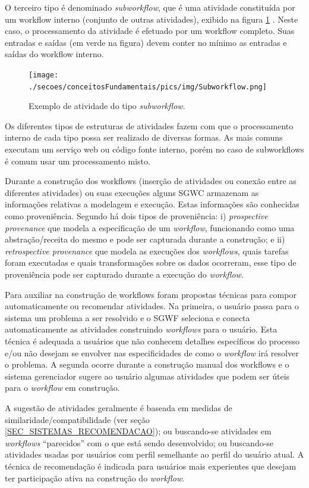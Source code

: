 O terceiro tipo é denominado \emph{subworkflow}, que é uma atividade constituída por um workflow interno (conjunto de outras atividades), exibido na figura \ref{figura_atividade_subworkflow} \cite{medeiros_woodss_2005}. Neste caso, o processamento da atividade é efetuado por um workflow completo. Suas entradas e saídas (em verde na figura) devem conter no mínimo as entradas e saídas do workflow interno.
\begin{figure}[!hbt]
    \centering  
    \caption{Exemplo de atividade do tipo \emph{subworkflow}.}
    \texttt{[image: ./secoes/conceitosFundamentais/pics/img/Subworkflow.png]}    
	\label{figura_atividade_subworkflow}
\end{figure}

Os diferentes tipos de estruturas de atividades fazem com que o processamento interno de cada tipo possa ser realizado de diversas formas. As mais comuns executam um serviço web ou código fonte interno, porém no caso de subworkflows é comum usar um processamento misto. 

Durante a construção dos workflows (inserção de atividades ou conexão entre as diferentes atividades) ou suas execuções alguns SGWC armazenam as informações relativas a modelagem e execução. Estas informações são conhecidas como proveniência. Segundo  há dois tipos de proveniência: i) \emph{prospective provenance} que modela a especificação de um \emph{workflow}, funcionando como uma abstração/receita do mesmo e pode ser capturada durante a construção; e ii) \emph{retrospective provenance} que modela as execuções dos \emph{workflows}, quais tarefas foram executadas e quais transformações sobre os dados ocorreram, esse tipo de proveniência pode ser capturado durante a execução do \emph{workflow}.

Para auxiliar na construção de workflows foram propostas técnicas para compor automaticamente ou recomendar atividades. Na primeira, o usuário passa para o sistema um problema a ser resolvido e o SGWF seleciona e conecta automaticamente as atividades construindo \emph{workflows} para o usuário. Esta técnica é adequada a usuários que não conhecem detalhes específicos do processo e/ou não desejam se envolver nas especificidades de como o \emph{workflow} irá resolver o problema. A segunda ocorre durante a construção manual dos workflows e o sistema gerenciador sugere ao usuário algumas atividades que podem ser úteis para o \emph{workflow} em construção. 

A sugestão de atividades geralmente é baseada em medidas de similaridade/compatibilidade (ver seção \ref{SEC_SISTEMAS_RECOMENDACAO}); ou buscando-se atividades em \emph{workflows} ``parecidos'' com o que está sendo desenvolvido; ou buscando-se atividades usadas por usuários com perfil semelhante ao perfil do usuário atual. A técnica de recomendação é indicada para usuários mais experientes que desejam ter participação ativa na construção do \emph{workflow}.


